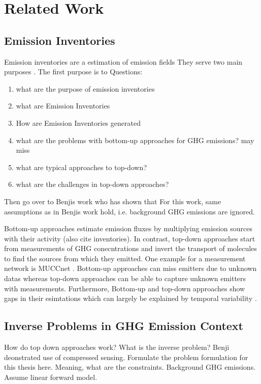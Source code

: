 
\chapter{Related Work}\label{chapter:related_work}

\section{Emission Inventories}
Emission inventories are a estimation of emission fields
They serve two main purposes \parencite{CAMS-REG-v4}.
The first purpose is to 
Questions:
\begin{enumerate}
    \item what are the purpose of emission inventories
    \item what are Emission Inventories
    \item How are Emission Inventories generated
    \item what are the problems with bottom-up approaches for GHG emissions? 
    \subitem may miss
    \item what are typical approaches to top-down?
    \item what are the challenges in top-down approaches?
\end{enumerate}
Then go over to Benjis work who has shown that 
For this work, same assumptions as in Benjis work hold, i.e. background GHG emissions are ignored.

Bottom-up approaches estimate emission fluxes by multiplying emission sources with their activity \parencite{BU-vs-TD} (also cite inventories).
In contrast, top-down approaches start from measurements of GHG conecntrations and invert the transport of molecules to find the sources from which they emitted.
One example for a measurement network is MUCCnet \parencite{MUCCnet}.
Bottom-up approaches can miss emitters due to unknown datas whereas top-down approaches can be able to capture unknown emitters with measurements.
Furthermore, 
Bottom-up and top-down approaches show gaps in their esimtations which can largely be explained by temporal variability \parencite{BU-vs-TD}.


\section{Inverse Problems in GHG Emission Context}
How do top down approaches work?
What is the inverse problem?
Benji deonstrated use of compressed sensing.
Formulate the problem formulation for this thesis here.
Meaning, what are the constraints.
Background GHG emissions.
Assume linear forward model.

